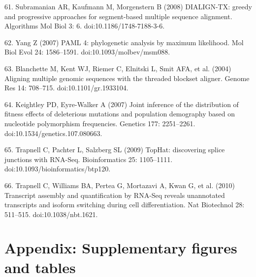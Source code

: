 61.	Subramanian AR, Kaufmann M, Morgenstern B (2008) DIALIGN-TX: greedy and progressive approaches for segment-based multiple sequence alignment. Algorithms Mol Biol 3: 6. doi:10.1186/1748-7188-3-6.

62.	Yang Z (2007) PAML 4: phylogenetic analysis by maximum likelihood. Mol Biol Evol 24: 1586–1591. doi:10.1093/molbev/msm088.

63.	Blanchette M, Kent WJ, Riemer C, Elnitski L, Smit AFA, et al. (2004) Aligning multiple genomic sequences with the threaded blockset aligner. Genome Res 14: 708–715. doi:10.1101/gr.1933104.

64.	Keightley PD, Eyre-Walker A (2007) Joint inference of the distribution of fitness effects of deleterious mutations and population demography based on nucleotide polymorphism frequencies. Genetics 177: 2251–2261. doi:10.1534/genetics.107.080663.

65.	Trapnell C, Pachter L, Salzberg SL (2009) TopHat: discovering splice junctions with RNA-Seq. Bioinformatics 25: 1105–1111. doi:10.1093/bioinformatics/btp120.

66.	Trapnell C, Williams BA, Pertea G, Mortazavi A, Kwan G, et al. (2010) Transcript assembly and quantification by RNA-Seq reveals unannotated transcripts and isoform switching during cell differentiation. Nat Biotechnol 28: 511–515. doi:10.1038/nbt.1621.


\section{Appendix: Supplementary figures and tables}

